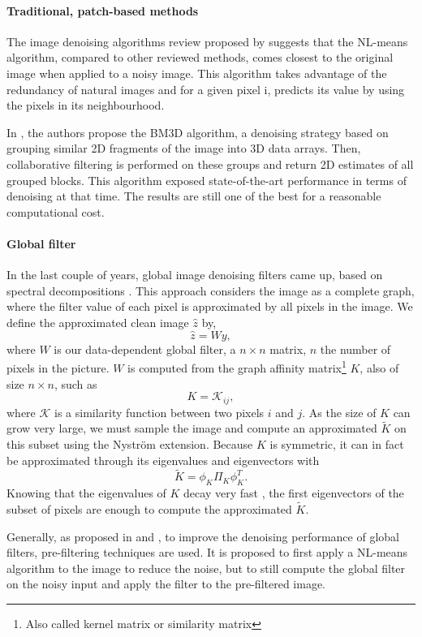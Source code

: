 \documentclass[]{article}
\begin{document}
\paragraph{Traditional, patch-based methods}
The image denoising algorithms review proposed by \cite{buades_review_2005} suggests that the NL-means algorithm, compared to other reviewed methods, comes closest to the original image when applied to a noisy image.
This algorithm takes advantage of the redundancy of natural images and for a given pixel i, predicts its value by using the pixels in its neighbourhood.

In \cite{dabov_image_2007}, the authors propose the BM3D algorithm, a denoising strategy based on grouping similar 2D fragments of the image into 3D data arrays. Then, collaborative filtering is performed on these groups and return 2D estimates of all grouped blocks.
This algorithm exposed state-of-the-art performance in terms of denoising at that time.
The results are still one of the best for a reasonable computational cost.

\paragraph{Global filter}
In the last couple of years, global image denoising filters came up, based on spectral decompositions \cite{glide_2014}.
This approach considers the image as a complete graph, where the filter value of each pixel is approximated by all pixels in the image.
We define the approximated clean image \(\hat{z}\) by,
\[\hat{z} = Wy,\]
where \(W\) is our data-dependent global filter, a \(n \times n\) matrix, \(n\) the number of pixels in the picture.
\(W\) is computed from the graph affinity matrix\footnote{Also called kernel matrix or similarity matrix} \(K\), also of size \(n \times n\), such as
\[K = {\mathcal{K}_{ij}},\]
where \(\mathcal{K}\) is a similarity function between two pixels \(i\) and \(j\).
As the size of \(K\) can grow very large, we must sample the image and compute an approximated \(\tilde{K}\) on this subset using the Nystr\"om extension.
Because \(K\) is symmetric, it can in fact be approximated through its eigenvalues and eigenvectors with
\[\tilde{K} = \phi_K \Pi_K \phi_K^T.\]
Knowing that the eigenvalues of \(K\) decay very fast \cite{siam_slides_2016}, the first eigenvectors of the subset of pixels are enough to compute the approximated \(\tilde{K}\).

Generally, as proposed in \cite{glide_2014} and \cite{talebi_asymptotic_2016}, to improve the denoising performance of global filters, pre-filtering techniques are used.
It is proposed to first apply a NL-means algorithm to the image to reduce the noise, but to still compute the global filter on the noisy input and apply the filter to the pre-filtered image.
\end{document}
